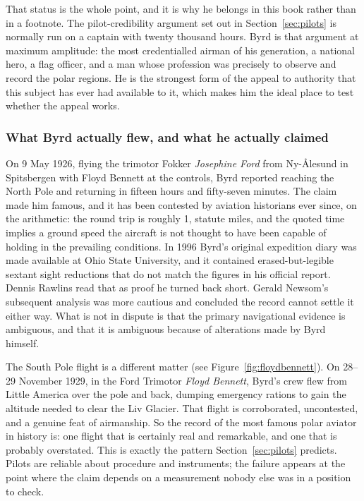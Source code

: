That status is the whole point, and it is why he belongs in this book rather than in a footnote.
The pilot-credibility argument set out in Section~\ref{sec:pilots} is normally run on a captain
with twenty thousand hours. Byrd is that argument at maximum amplitude: the most credentialled
airman of his generation, a national hero, a flag officer, and a man whose profession was
precisely to observe and record the polar regions.  He is the strongest form of the appeal to authority that this
subject has ever had available to it, which makes him the ideal place to test whether the appeal
works.

\Needspace*{0.40\textheight}
\subsubsection*{What Byrd actually flew, and what he actually claimed}
On 9 May 1926, flying the trimotor Fokker \emph{Josephine Ford} from Ny-{\AA}lesund in Spitsbergen
with Floyd Bennett at the controls, Byrd reported reaching the North Pole and returning in fifteen
hours and fifty-seven minutes. The claim made him famous, and it has been contested by aviation
historians ever since, on the arithmetic: the round trip is roughly 1, statute miles, and the
quoted time implies a ground speed the aircraft is not thought to have been capable of holding in
the prevailing conditions. In 1996 Byrd's original expedition diary was made available at Ohio
State University, and it contained erased-but-legible sextant sight reductions that do not match
the figures in his official report. Dennis Rawlins read that as proof he turned back short.
Gerald Newsom's subsequent analysis was more cautious and concluded the record cannot settle it
either way. What is not in dispute is that the primary navigational evidence is ambiguous, and
that it is ambiguous because of alterations made by Byrd himself.

The South Pole flight is a different matter (see Figure~\ref{fig:floydbennett}). On 28--29 November
1929, in the Ford Trimotor \emph{Floyd Bennett}, Byrd's crew flew from Little America over the pole
and back, dumping emergency rations to gain the altitude needed to clear the Liv Glacier. That
flight is corroborated, uncontested, and a genuine feat of airmanship. So the record of the most
famous polar aviator in history is: one flight that is certainly real and remarkable, and one that
is probably overstated. This is exactly the pattern Section~\ref{sec:pilots} predicts. Pilots are
reliable about procedure and instruments; the failure appears at the point where the claim depends
on a measurement nobody else was in a position to check.

